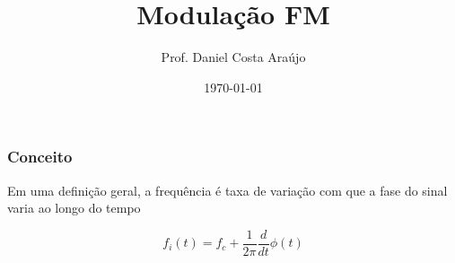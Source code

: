 \documentclass{beamer}
\title{Modulação FM}
\author{Prof. Daniel Costa Araújo}
\date{\today}
\begin{document}
\begin{frame}
    \frametitle{Conceito}

    Em uma definição geral, a frequência é taxa de variação com que a fase do sinal varia ao longo do tempo

$$
f_i(t) = f_c + \frac{1}{2\pi}\frac{d}{dt} \phi (t)
$$

\end{frame}
\end{document}
